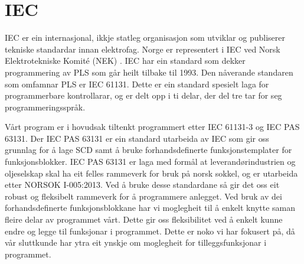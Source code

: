 \section{IEC}
\thispagestyle{fancy}
\label{sec:5.2}


\gls{IEC} \citep{IEC} er ein internasjonal, ikkje statleg organisasjon som utviklar og publiserer tekniske standardar innan elektrofag. 
Norge er representert i \gls{IEC} ved Norsk Elektrotekniske Komité (\gls{NEK}) \citep{IEC-SNL}. 
\gls{IEC} har ein standard som dekker programmering av \gls{PLS} som går heilt tilbake til 1993\citep{Wiki-93}. 
Den nåverande standaren som omfamnar PLS er IEC 61131\citep{IEC-61131}. Dette er ein standard spesielt laga for programmerbare kontrollarar, og er delt opp i ti delar, der del tre tar for seg programmeringsspråk. 

Vårt program er i hovudsak tiltenkt programmert etter \gls{IEC} 61131-3 og \gls{IEC} \gls{PAS} 63131\citep{IEC-63131}. 
Der \gls{IEC} \gls{PAS} 63131 er ein standard utarbeida av \gls{IEC} som gir oss grunnlag for å lage \gls{SCD} samt å bruke forhandsdefinerte funksjonstemplater for funksjonsblokker. 
\gls{IEC} \gls{PAS} 63131 er laga med formål at leverandørindustrien og oljeselskap skal ha eit felles rammeverk for bruk på norsk sokkel, og er utarbeida etter NORSOK I-005:2013.
Ved å bruke desse standardane så gir det oss eit robust og fleksibelt rammeverk for å programmere anlegget. 
Ved bruk av dei forhandsdefinerte funksjonsblokkane har vi moglegheit til å enkelt knytte saman fleire delar av programmet vårt. 
Dette gir oss fleksibilitet ved å enkelt kunne endre og legge til funksjonar i programmet. 
Dette er noko vi har fokusert på, då vår sluttkunde har ytra eit ynskje om moglegheit for tilleggsfunksjonar i programmet. 
\newpage

